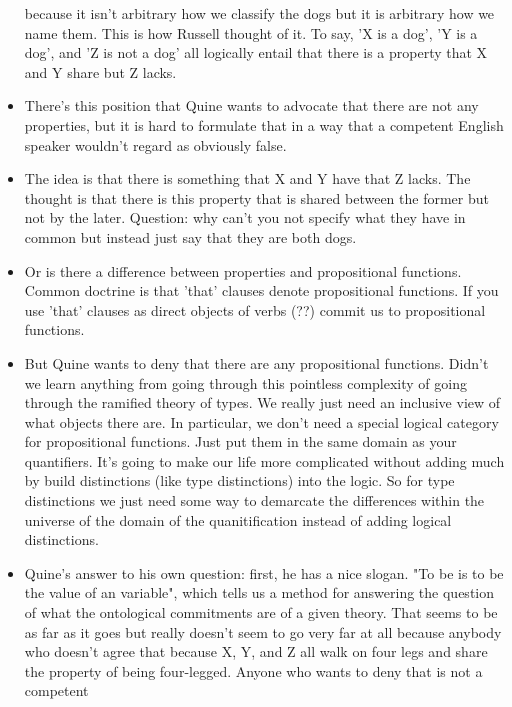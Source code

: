 \documentclass[12pt]{article}
\theoremstyle{definition}
\begin{document}
\begin{itemize}
        because it isn't arbitrary how we classify the dogs but it is arbitrary
        how we name them. This is how Russell thought of it. To say, 'X is a
        dog', 'Y is a dog', and 'Z is not a dog' all logically entail that
        there is a property that X and Y share but Z lacks.
    \item
        There's this position that Quine wants to advocate that there are not
        any properties, but it is hard to formulate that in a way that a
        competent English speaker wouldn't regard as obviously false.
    \item
        The idea is that there is something that X and Y have that Z lacks. The
        thought is that there is this property that is shared between the
        former but not by the later. Question: why can't you not specify what
        they have in common but instead just say that they are both dogs.
    \item
        Or is there a difference between properties and propositional
        functions. Common doctrine is that 'that' clauses denote propositional
        functions. If you use 'that' clauses as direct objects of verbs (??)
        commit us to propositional functions.
    \item
        But Quine wants to deny that there are any propositional functions.
        Didn't we learn anything from going through this pointless complexity
        of going through the ramified theory of types. We really just need an
        inclusive view of what objects there are. In particular, we don't need
        a special logical category for propositional functions. Just put them
        in the same domain as your quantifiers. It's going to make our life
        more complicated without adding much by build distinctions (like type
        distinctions) into the logic. So for type distinctions we just need
        some way to demarcate the differences within the universe of the domain
        of the quanitification instead of adding logical distinctions. 
    \item
        Quine's answer to his own question: first, he has a nice slogan. "To be
        is to be the value of an variable", which tells us a method for
        answering the question of what the ontological commitments are of a
        given theory. That seems to be as far as it goes but really doesn't
        seem to go very far at all because anybody who doesn't agree that
        because X, Y, and Z all walk on four legs and share the property of
        being four-legged. Anyone who wants to deny that is not a competent

\end{itemize}
\end{document}
